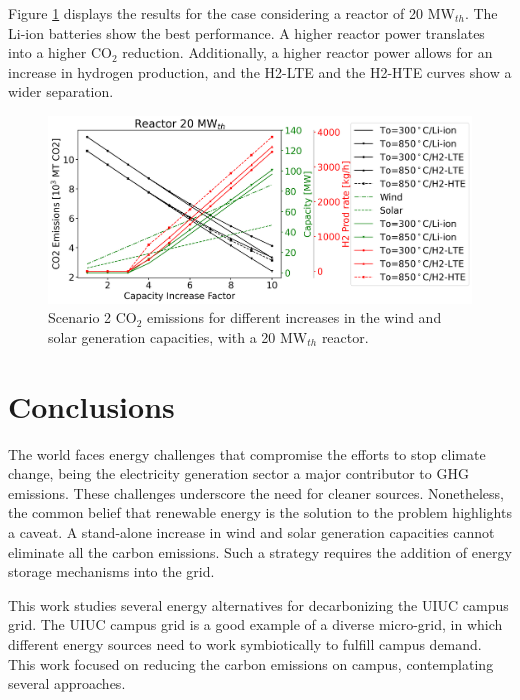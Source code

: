 \documentclass{anstrans}
\begin{document}
Figure \ref{fig:2-summer-20-emissions} displays the results for the case considering a reactor of 20 MW$_{th}$.
The Li-ion batteries show the best performance.
A higher reactor power translates into a higher CO$_2$ reduction.
Additionally, a higher reactor power allows for an increase in hydrogen production, and the H2-LTE and the H2-HTE curves show a wider separation.

\begin{figure}[htbp!] %
    \centering
    \includegraphics[width=0.99\linewidth]{figures/scenario2-20-summer-emissions}
    \hfill
    \caption{Scenario 2 CO$_2$ emissions for different increases in the wind and solar generation capacities, with a 20 MW$_{th}$ reactor.}
    \label{fig:2-summer-20-emissions}
\end{figure}


\section{Conclusions}

The world faces energy challenges that compromise the efforts to stop climate change, being the electricity generation sector a major contributor to GHG emissions.
These challenges underscore the need for cleaner sources.
Nonetheless, the common belief that renewable energy is the solution to the problem highlights a caveat.
A stand-alone increase in wind and solar generation capacities cannot eliminate all the carbon emissions.
Such a strategy requires the addition of energy storage mechanisms into the grid.

This work studies several energy alternatives for decarbonizing the UIUC campus grid.
The UIUC campus grid is a good example of a diverse micro-grid, in which different energy sources need to work symbiotically to fulfill campus demand.
This work focused on reducing the carbon emissions on campus, contemplating several approaches.
\end{document}
